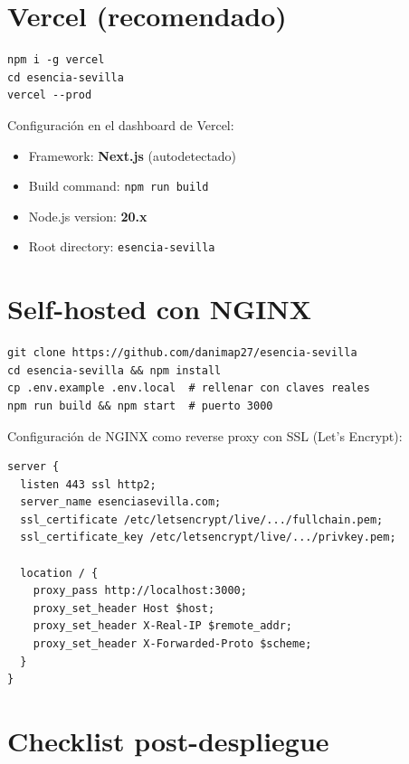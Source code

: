 \documentclass[12pt,a4paper,twoside,openright]{report}
\begin{document}
\section{Vercel (recomendado)}

\begin{lstlisting}[style=bashStyle]
npm i -g vercel
cd esencia-sevilla
vercel --prod
\end{lstlisting}

Configuración en el dashboard de Vercel:
\begin{itemize}
  \item Framework: \textbf{Next.js} (autodetectado)
  \item Build command: \texttt{npm run build}
  \item Node.js version: \textbf{20.x}
  \item Root directory: \texttt{esencia-sevilla}
\end{itemize}

\section{Self-hosted con NGINX}

\begin{lstlisting}[style=bashStyle]
git clone https://github.com/danimap27/esencia-sevilla
cd esencia-sevilla && npm install
cp .env.example .env.local  # rellenar con claves reales
npm run build && npm start  # puerto 3000
\end{lstlisting}

Configuración de NGINX como reverse proxy con SSL (Let's Encrypt):

\begin{lstlisting}[style=bashStyle]
server {
  listen 443 ssl http2;
  server_name esenciasevilla.com;
  ssl_certificate /etc/letsencrypt/live/.../fullchain.pem;
  ssl_certificate_key /etc/letsencrypt/live/.../privkey.pem;

  location / {
    proxy_pass http://localhost:3000;
    proxy_set_header Host $host;
    proxy_set_header X-Real-IP $remote_addr;
    proxy_set_header X-Forwarded-Proto $scheme;
  }
}
\end{lstlisting}

\section{Checklist post-despliegue}
\end{document}

